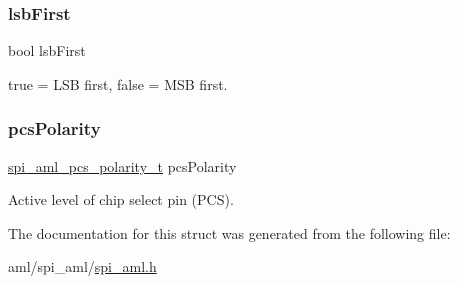 \subsubsection{\texorpdfstring{lsbFirst}{lsbFirst}}
{\footnotesize\ttfamily bool lsb\+First}

true = L\+SB first, false = M\+SB first. \mbox{\label{structspi__aml__slave__config__t_a5ab3ca2262578bfbad4d009e8c12d416}} 
\subsubsection{\texorpdfstring{pcsPolarity}{pcsPolarity}}
{\footnotesize\ttfamily \mbox{\hyperlink{group__enum__group_ga376ab165389ceb9a6e3f763263ff7e06}{spi\+\_\+aml\+\_\+pcs\+\_\+polarity\+\_\+t}} pcs\+Polarity}

Active level of chip select pin (P\+CS). 

The documentation for this struct was generated from the following file\+:\begin{DoxyCompactItemize}
\item 
aml/spi\+\_\+aml/\mbox{\hyperlink{spi__aml_8h}{spi\+\_\+aml.\+h}}\end{DoxyCompactItemize}
